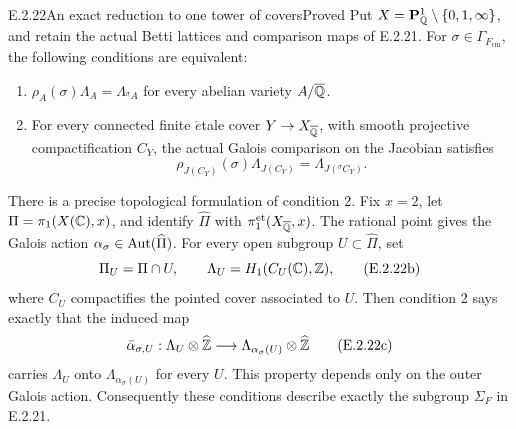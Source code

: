 \begin{result}{E.2.22}{An exact reduction to one tower of covers}{Proved}
Put \(X=\mathbf P^1_{\mathbb Q}\setminus\{0,1,\infty\}\), and retain
the actual Betti lattices and comparison maps of E.2.21.
For \(\sigma\in\Gamma_{F_{\mathrm{cm}}}\), the following
conditions are equivalent:
\begin{enumerate}
\item \(\rho_A(\sigma)\Lambda_A=\Lambda_{{}^{\sigma}A}\)
for every abelian variety \(A/\overline{\mathbb Q}\).
\item For every connected finite \(\acute{e}\)tale cover
\(Y\to X_{\overline{\mathbb Q}}\), with smooth projective compactification
\(C_Y\), the actual Galois comparison on the Jacobian satisfies
\[
 \rho_{J(C_Y)}(\sigma)\Lambda_{J(C_Y)}
       =\Lambda_{J({}^{\sigma}C_Y)}.
 \tag{E.2.22a}
\]
\end{enumerate}
There is a precise topological formulation of condition 2.
Fix \(x=2\), let \(\Pi=\pi_1(X(\mathbb C),x)\), and identify
\(\widehat\Pi\) with \(\pi_1^{\mathrm{et}}(X_{\overline{\mathbb Q}},x)\).
The rational point gives the Galois action
\(\alpha_\sigma\in\operatorname{Aut}(\widehat\Pi)\).
For every open subgroup \(U\subset\widehat\Pi\), set
\[
 \Pi_U=\Pi\cap U,\qquad
 \Lambda_U=H_1(C_U(\mathbb C),\mathbb Z),
 \tag{E.2.22b}
\]
where \(C_U\) compactifies the pointed cover associated to \(U\).
Then condition 2 says exactly that the induced map
\[
 \bar\alpha_{\sigma,U}:
 \Lambda_U\otimes\widehat{\mathbb Z}
       \longrightarrow
 \Lambda_{\alpha_\sigma(U)}\otimes\widehat{\mathbb Z}
 \tag{E.2.22c}
\]
carries \(\Lambda_U\) onto \(\Lambda_{\alpha_\sigma(U)}\)
for every \(U\). This property depends only on the outer
Galois action. Consequently these conditions describe exactly
the subgroup \(\Sigma_F\) in E.2.21.
\end{result}
